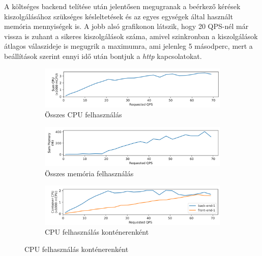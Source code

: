 A költséges backend telítése után jelentősen megugranak a beérkező kérések kiszolgálásához szükséges késleltetések és az egyes egységek által használt memória mennyiségek is.
A jobb alsó grafikonon látszik, hogy 20 QPS-nél már vissza is zuhant a sikeres kiszolgálások száma, amivel szinkronban a kiszolgálások átlagos válaszideje is megugrik a maximumra, ami jelenleg 5 másodperc, mert a beállítások szerint ennyi idő után bontjuk a \textit{http} kapcsolatokat.



\begin{figure}
\centering
\begin{subfigure}{\textwidth}
    \includegraphics[width=\textwidth]{figures/3FE-1BE-stack/sum-cpu.png}
    \caption{Összes CPU felhasználás}
    \label{subfig:sum-cpu}
\end{subfigure}

\hfill
\begin{subfigure}{\textwidth}
    \includegraphics[width=\textwidth]{figures/3FE-1BE-stack/sum-mem.png}
    \caption{Összes memória felhasználás}
    \label{subfig:sum-mem}
\end{subfigure}

\hfill
\begin{subfigure}{\textwidth}
    \includegraphics[width=\textwidth]{figures/3FE-1BE-stack/container-cpu.png}
    \caption{CPU felhasználás konténerenként}
    \label{subfig:container-cpu}
\end{subfigure}


\end{figure}
